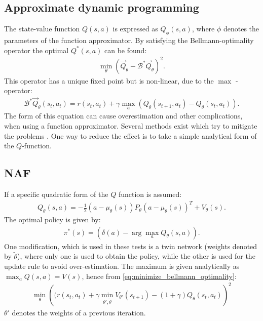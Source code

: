 \documentclass[
 reprint,
 amsmath,amssymb,amsfonts,clevref,
 aps,
prstab,
]{revtex4-2}
\begin{document}
\subsection{Approximate dynamic programming}
The state-value function $Q(s,a)$ is expressed as $Q_\phi(s,a)$, where $\phi$ denotes the parameters of the function approximator. By satisfying the Bellmann-optimality operator the optimal $Q^*(s,a)$ can be found:
\begin{align}
    \min_\theta \left(\vec Q_\theta - \mathcal{B}^*\vec Q_\theta\right)^2.\label{eq:minimize_bellmann_optimality}
\end{align}
This operator has a unique fixed point but is non-linear, due to the $\max$ - operator:
\begin{align}
 \mathcal{B}^*\vec Q_\theta(s_t,a_t) = r(s_t,a_t)+\gamma\max_a\left( Q_\theta(s_{t+1},a_t) - Q_\theta(s_t,a_t)\right).
\end{align}
The form of this equation can cause overestimation and other complications, when using a function approximator. Several methods exist which try to mitigate the problems \cite{}.
One way to reduce the effect is to take a simple analytical form of the $Q$-function.
\subsection{NAF}
If a specific quadratic form of the $Q$ function is assumed:
\begin{align}
     Q_\theta(s,a) = -\frac{1}{2}(a-\mu_\theta(s))P_\theta(a-\mu_\theta(s))^T+V_\theta(s).
\end{align}
 The optimal policy is given by:
\begin{align}
    \pi^*(s)=(\delta(a)-\arg\!\max_a Q_\theta(s,a)).
\end{align}
One modification, which is used in these tests is a twin network (weights denoted by $\tilde\theta$), where only one is used to obtain the policy, while the other is used for the update rule to avoid over-estimation.
The maximum is given analytically as $\max_a Q(s,a) = V(s)$, hence from \cref{eq:minimize_bellmann_optimality}:
\begin{align}
	\min_\theta\left( (r(s_t,a_t)+\gamma \min_{\theta\prime,\tilde \theta} V_{\theta\prime}(s_{t+1}) - (1+\gamma) Q_\theta(s_t,a_t)\right)^2
\end{align}
$\theta\prime$ denotes the weights of a previous iteration.
\end{document}
